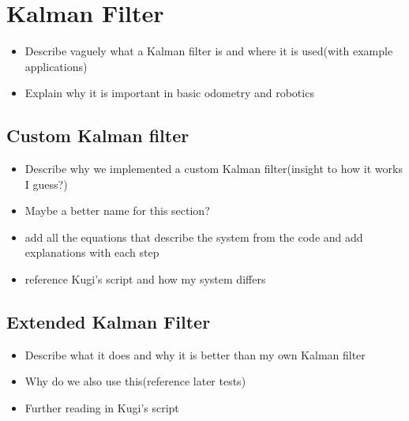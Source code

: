 \chapter{Kalman Filter}\label{cha:KalmanFilter}
\pagestyle{scrheadings}


\begin{itemize}
 \item Describe vaguely what a Kalman filter is and where it is used(with example applications)
 \item Explain why it is important in basic odometry and robotics
\end{itemize}

\section{Custom Kalman filter}\label{sec:custom_kalman}

\begin{itemize}
 \item Describe why we implemented a custom Kalman filter(insight to how it works I guess?)
 \item Maybe a better name for this section?
 \item add all the equations that describe the system from the code and add explanations with each step
 \item reference Kugi's script and how my system differs
\end{itemize}

\section{Extended Kalman Filter}\label{sec:extended_kalman}

\begin{itemize}
 \item Describe what it does and why it is better than my own Kalman filter
 \item Why do we also use this(reference later tests)
 \item Further reading in Kugi's script
\end{itemize}

